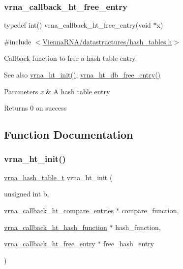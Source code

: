 \subsubsection{\texorpdfstring{vrna\_callback\_ht\_free\_entry}{vrna\_callback\_ht\_free\_entry}}
{\footnotesize\ttfamily typedef int() vrna\+\_\+callback\+\_\+ht\+\_\+free\+\_\+entry(void $\ast$x)}



{\ttfamily \#include $<$\mbox{\hyperlink{hash__tables_8h}{Vienna\+R\+N\+A/datastructures/hash\+\_\+tables.\+h}}$>$}



Callback function to free a hash table entry. 

\begin{DoxySeeAlso}{See also}
\mbox{\hyperlink{group__hash__table__utils_ga37d1c7e13087a2b7c1b87fda34577c29}{vrna\+\_\+ht\+\_\+init()}}, \mbox{\hyperlink{group__hash__table__utils_gabcdcd0d070b3dfd2634a09e7838acf66}{vrna\+\_\+ht\+\_\+db\+\_\+free\+\_\+entry()}} 
\end{DoxySeeAlso}

\begin{DoxyParams}{Parameters}
{\em x} & A hash table entry \\
\hline
\end{DoxyParams}
\begin{DoxyReturn}{Returns}
0 on success 
\end{DoxyReturn}


\subsection{Function Documentation}
\mbox{\label{group__hash__table__utils_ga37d1c7e13087a2b7c1b87fda34577c29}} 
\subsubsection{\texorpdfstring{vrna\_ht\_init()}{vrna\_ht\_init()}}
{\footnotesize\ttfamily \mbox{\hyperlink{group__hash__table__utils_gabc7c6f41b718c8e23929e528891a89c4}{vrna\+\_\+hash\+\_\+table\+\_\+t}} vrna\+\_\+ht\+\_\+init (\begin{DoxyParamCaption}\item[{unsigned int}]{b,  }\item[{\mbox{\hyperlink{group__hash__table__utils_gace4adf608f9dc246f66f6264d30c0f8d}{vrna\+\_\+callback\+\_\+ht\+\_\+compare\+\_\+entries}} $\ast$}]{compare\+\_\+function,  }\item[{\mbox{\hyperlink{group__hash__table__utils_ga8533dc0cb44035d5fdb05e3c28922d2b}{vrna\+\_\+callback\+\_\+ht\+\_\+hash\+\_\+function}} $\ast$}]{hash\+\_\+function,  }\item[{\mbox{\hyperlink{group__hash__table__utils_ga3ff18cc70db8bb6f8cfee2c2b1542afc}{vrna\+\_\+callback\+\_\+ht\+\_\+free\+\_\+entry}} $\ast$}]{free\+\_\+hash\+\_\+entry }\end{DoxyParamCaption})}



